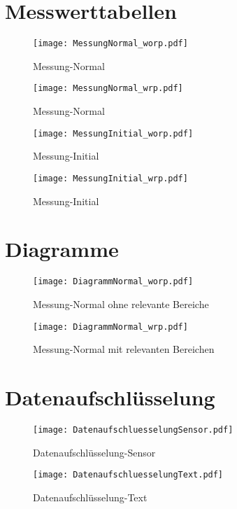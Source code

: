 \section{Messwerttabellen}

\label{sec:messtabellen}

\begin{figure}[H]
	\texttt{[image: MessungNormal\_worp.pdf]}
	\caption{Messung-Normal}	
\end{figure}

\newpage

\begin{figure}[H]
	\texttt{[image: MessungNormal\_wrp.pdf]}
	\caption{Messung-Normal}	
\end{figure}

\newpage

\begin{figure}[H]
	\texttt{[image: MessungInitial\_worp.pdf]}
	\caption{Messung-Initial}	
\end{figure}

\newpage

\begin{figure}[H]
	\texttt{[image: MessungInitial\_wrp.pdf]}
	\caption{Messung-Initial}	
\end{figure}

\section{Diagramme}
\label{sec:Diagramme}

\begin{figure}[H]
	\centering
	\texttt{[image: DiagrammNormal\_worp.pdf]}
	\label{fig:diagrammNormal_worp}
	\caption{Messung-Normal ohne relevante Bereiche}
\end{figure}

\begin{figure}[H]
	\centering
	\texttt{[image: DiagrammNormal\_wrp.pdf]}
	\label{fig:diagrammNormal_wrp}
	\caption{Messung-Normal mit relevanten Bereichen}
\end{figure}

\section{Datenaufschlüsselung}
\label{sec:Datenaufschluesselung}

\begin{figure}[H]
	\centering
	\texttt{[image: DatenaufschluesselungSensor.pdf]}
	\caption{Datenaufschlüsselung-Sensor}
\end{figure}

\begin{figure}[H]
	\centering
	\texttt{[image: DatenaufschluesselungText.pdf]}
	\caption{Datenaufschlüsselung-Text}
\end{figure}
